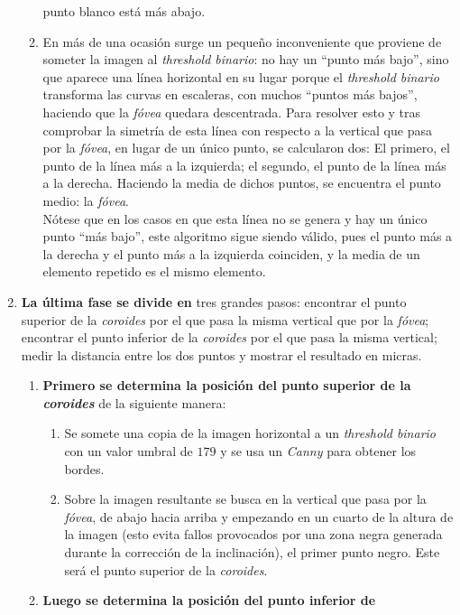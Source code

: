 \begin{enumerate}
\begin{enumerate}[label*=\arabic*.]
    punto blanco está más abajo.
  \item En más de una ocasión surge un pequeño inconveniente que
    proviene de someter la imagen al \emph{threshold binario}: no hay
    un ``punto más bajo'', sino que aparece una línea horizontal en su
    lugar porque el \emph{threshold binario} transforma las curvas en
    escaleras, con muchos ``puntos más bajos'', haciendo que la
    \emph{fóvea} quedara descentrada. Para resolver esto y tras
    comprobar la simetría de esta línea con respecto a la vertical que
    pasa por la \emph{fóvea}, en lugar de un único punto, se
    calcularon dos: El primero, el punto de la línea más a la
    izquierda; el segundo, el punto de la línea más a la
    derecha. Haciendo la media de dichos
    puntos, se encuentra el punto medio: la \emph{fóvea}. \\
    Nótese que en los casos en que esta línea no se genera y hay un
    único punto ``más bajo'', este algoritmo sigue siendo válido, pues
    el punto más a la derecha y el punto más a la izquierda coinciden,
    y la media de un elemento repetido es el mismo elemento.
  \end{enumerate}
\item \textbf{La última fase se divide en} tres grandes pasos:
  encontrar el punto superior de la \emph{coroides} por el que pasa la
  misma vertical que por la \emph{fóvea}; encontrar el punto inferior
  de la \emph{coroides} por el que pasa la misma vertical; medir la
  distancia entre los dos puntos y mostrar el resultado en micras.
  \begin{enumerate}[label*=\arabic*.]
  \item \textbf{Primero se determina la posición del punto superior de
      la \emph{coroides}} de la siguiente manera:
    \begin{enumerate}[label*=\arabic*.]
    \item Se somete una copia de la imagen horizontal a un
      \emph{threshold binario} con un valor umbral de $179$ y se usa
      un \emph{Canny} para obtener los bordes.
    \item Sobre la imagen resultante se busca en la vertical que pasa
      por la \emph{fóvea}, de abajo hacia arriba y empezando en un
      cuarto de la altura de la imagen (esto evita fallos provocados
      por una zona negra generada durante la corrección de la
      inclinación), el primer punto negro. Este será el punto superior
      de la \emph{coroides}.
    \end{enumerate}
  \item \textbf{Luego se determina la posición del punto inferior de
}
\end{enumerate}
\end{enumerate}
